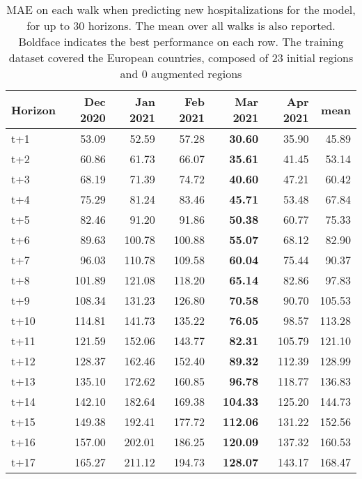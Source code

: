\begin{table}[H]
\centering
\caption{MAE on each walk when predicting new hospitalizations for the model, for up to 30 horizons. The mean over all walks is also reported. Boldface indicates the best performance on each row. The training dataset covered the European countries, composed of 23 initial regions and 0 augmented regions }
\label{tab:MAE_walk_custom_linear_regression}
\begin{tabular}{lrrrrrr}
\toprule
Horizon &  Dec 2020 &  Jan 2021 &  Feb 2021 &  Mar 2021 &  Apr 2021 &   mean \\
\midrule
t+1  & 53.09  & 52.59  & 57.28  & \textbf{30.60}  & 35.90  & 45.89  \\
t+2  & 60.86  & 61.73  & 66.07  & \textbf{35.61}  & 41.45  & 53.14  \\
t+3  & 68.19  & 71.39  & 74.72  & \textbf{40.60}  & 47.21  & 60.42  \\
t+4  & 75.29  & 81.24  & 83.46  & \textbf{45.71}  & 53.48  & 67.84  \\
t+5  & 82.46  & 91.20  & 91.86  & \textbf{50.38}  & 60.77  & 75.33  \\
t+6  & 89.63  & 100.78  & 100.88  & \textbf{55.07}  & 68.12  & 82.90  \\
t+7  & 96.03  & 110.78  & 109.58  & \textbf{60.04}  & 75.44  & 90.37  \\
t+8  & 101.89  & 121.08  & 118.20  & \textbf{65.14}  & 82.86  & 97.83  \\
t+9  & 108.34  & 131.23  & 126.80  & \textbf{70.58}  & 90.70  & 105.53  \\
t+10  & 114.81  & 141.73  & 135.22  & \textbf{76.05}  & 98.57  & 113.28  \\
t+11  & 121.59  & 152.06  & 143.77  & \textbf{82.31}  & 105.79  & 121.10  \\
t+12  & 128.37  & 162.46  & 152.40  & \textbf{89.32}  & 112.39  & 128.99  \\
t+13  & 135.10  & 172.62  & 160.85  & \textbf{96.78}  & 118.77  & 136.83  \\
t+14  & 142.10  & 182.64  & 169.38  & \textbf{104.33}  & 125.20  & 144.73  \\
t+15  & 149.38  & 192.41  & 177.72  & \textbf{112.06}  & 131.22  & 152.56  \\
t+16  & 157.00  & 202.01  & 186.25  & \textbf{120.09}  & 137.32  & 160.53  \\
t+17  & 165.27  & 211.12  & 194.73  & \textbf{128.07}  & 143.17  & 168.47  \\

\end{tabular}
\end{table}
